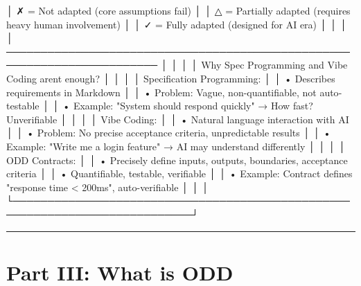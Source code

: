 \documentclass[
]{article}
\newenvironment{Shaded}{}{}
\newcommand{\NormalTok}[1]{#1}
\begin{document}
\begin{Shaded}
\begin{Highlighting}[]
\NormalTok{│  ✗ = Not adapted (core assumptions fail)                                  │}
\NormalTok{│  △ = Partially adapted (requires heavy human involvement)                 │}
\NormalTok{│  ✓ = Fully adapted (designed for AI era)                                  │}
\NormalTok{│                                                                            │}
\NormalTok{│  ──────────────────────────────────────────────────────────────────────── │}
\NormalTok{│                                                                            │}
\NormalTok{│  Why Spec Programming and Vibe Coding aren\textquotesingle{}t enough?                      │}
\NormalTok{│                                                                            │}
\NormalTok{│  Specification Programming:                                               │}
\NormalTok{│  • Describes requirements in Markdown                                     │}
\NormalTok{│  • Problem: Vague, non{-}quantifiable, not auto{-}testable                   │}
\NormalTok{│  • Example: "System should respond quickly" → How fast? Unverifiable     │}
\NormalTok{│                                                                            │}
\NormalTok{│  Vibe Coding:                                                             │}
\NormalTok{│  • Natural language interaction with AI                                   │}
\NormalTok{│  • Problem: No precise acceptance criteria, unpredictable results        │}
\NormalTok{│  • Example: "Write me a login feature" → AI may understand differently   │}
\NormalTok{│                                                                            │}
\NormalTok{│  ODD Contracts:                                                           │}
\NormalTok{│  • Precisely define inputs, outputs, boundaries, acceptance criteria     │}
\NormalTok{│  • Quantifiable, testable, verifiable                                    │}
\NormalTok{│  • Example: Contract defines "response time \textless{} 200ms", auto{-}verifiable    │}
\NormalTok{│                                                                            │}
\NormalTok{└────────────────────────────────────────────────────────────────────────────┘}
\end{Highlighting}
\end{Shaded}

\begin{center}\rule{0.5\linewidth}{0.5pt}\end{center}

\hypertarget{part-iii-what-is-odd}{%
\section{Part III: What is ODD}\label{part-iii-what-is-odd}}
\end{document}
